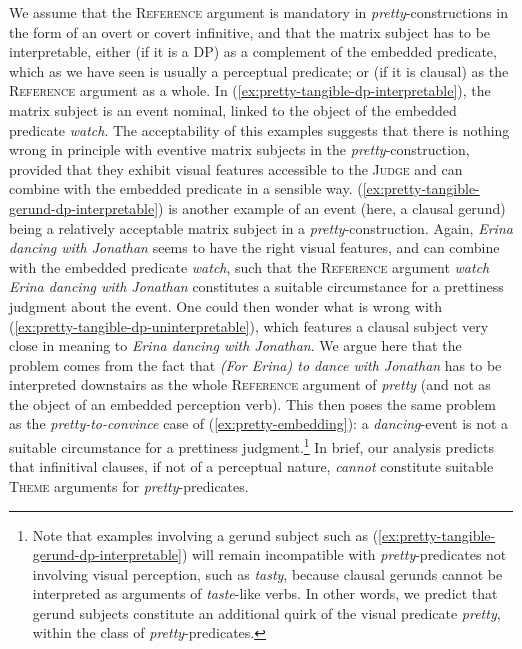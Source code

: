 \documentclass[11pt]{article}
\begin{document}
We assume that the \textsc{Reference} argument is mandatory in \textit{pretty}-constructions in the form of an overt or covert infinitive, and that the matrix subject has to be interpretable, either (if it is a DP) as a complement of the embedded predicate, which as we have seen is usually a perceptual predicate; or (if it is clausal) as the \textsc{Reference} argument as a whole. In (\ref{ex:pretty-tangible-dp-interpretable}), the matrix subject is an event nominal, linked to the object of the embedded predicate \textit{watch}. The acceptability of this examples suggests that there is nothing wrong in principle with eventive matrix subjects in the \textit{pretty}-construction, provided that they exhibit visual features accessible to the \textsc{Judge} and can combine with the embedded predicate in a sensible way. (\ref{ex:pretty-tangible-gerund-dp-interpretable}) is another example of an event (here, a clausal gerund) being a relatively acceptable matrix subject in a \textit{pretty}-construction. Again, \textit{Erina dancing with Jonathan} seems to have the right visual features, and can combine with the embedded predicate \textit{watch}, such that the \textsc{Reference} argument \textit{watch Erina dancing with Jonathan} constitutes a suitable circumstance for a prettiness judgment about the event. One could then wonder what is wrong with (\ref{ex:pretty-tangible-dp-uninterpretable}), which features a clausal subject very close in meaning to \textit{Erina dancing with Jonathan}. We argue here that the problem comes from the fact that \textit{(For Erina) to dance with Jonathan} has to be interpreted downstairs as the whole \textsc{Reference} argument of \textit{pretty} (and not as the object of an embedded perception verb). This then poses the same problem as the \textit{pretty-to-convince} case of (\ref{ex:pretty-embedding}): a \textit{dancing}-event is not a suitable circumstance for a prettiness judgment.\footnote{Note that examples involving a gerund subject such as (\ref{ex:pretty-tangible-gerund-dp-interpretable}) will remain incompatible with \textit{pretty}-predicates not involving visual perception, such as \textit{tasty}, because clausal gerunds cannot be interpreted as arguments of \textit{taste}-like verbs. In other words, we predict that gerund subjects constitute an additional quirk of the visual predicate \textit{pretty}, within the class of \textit{pretty}-predicates.} In brief, our analysis predicts that infinitival clauses, if not of a perceptual nature, \textit{cannot} constitute suitable \textsc{Theme} arguments for \textit{pretty}-predicates.\\
\end{document}
